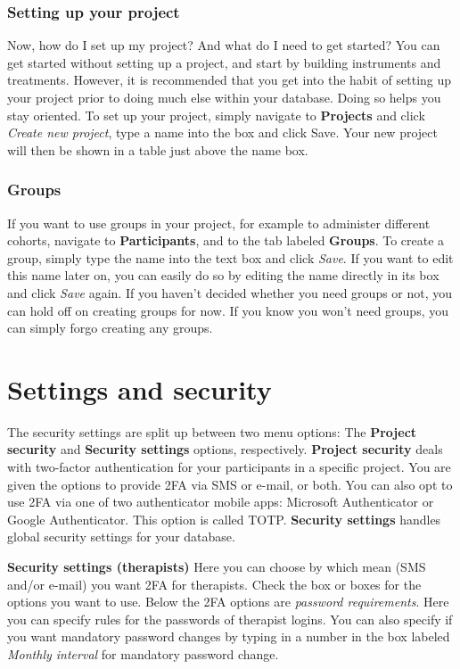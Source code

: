 \documentclass[
]{book}
\begin{document}
\subsection{Setting up your project}\label{setting-up-your-project}

Now, how do I set up my project? And what do I need to get started?
You can get started without setting up a project, and start by building instruments and treatments. However, it is recommended that you get into the habit of setting up your project prior to doing much else within your database. Doing so helps you stay oriented. To set up your project, simply navigate to \textbf{Projects} and click \emph{Create new project}, type a name into the box and click Save. Your new project will then be shown in a table just above the name box.

\subsection{Groups}\label{groups}

If you want to use groups in your project, for example to administer different cohorts, navigate to \textbf{Participants}, and to the tab labeled \textbf{Groups}. To create a group, simply type the name into the text box and click \emph{Save}. If you want to edit this name later on, you can easily do so by editing the name directly in its box and click \emph{Save} again.
If you haven't decided whether you need groups or not, you can hold off on creating groups for now. If you know you won't need groups, you can simply forgo creating any groups.

\chapter{Settings and security}\label{settings-and-security}

The security settings are split up between two menu options: The \textbf{Project security} and \textbf{Security settings} options, respectively. \textbf{Project security} deals with two-factor authentication for your participants in a specific project. You are given the options to provide 2FA via SMS or e-mail, or both. You can also opt to use 2FA via one of two authenticator mobile apps: Microsoft Authenticator or Google Authenticator. This option is called TOTP.
\textbf{Security settings} handles global security settings for your database.

\textbf{Security settings (therapists)}
Here you can choose by which mean (SMS and/or e-mail) you want 2FA for therapists. Check the box or boxes for the options you want to use.
Below the 2FA options are \emph{password requirements}. Here you can specify rules for the passwords of therapist logins. You can also specify if you want mandatory password changes by typing in a number in the box labeled \emph{Monthly interval} for mandatory password change.
\end{document}
